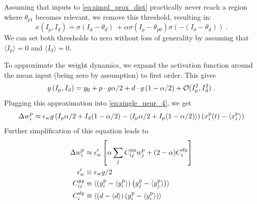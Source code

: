 \documentclass[10pt,a4paper,draft]{article}
\newcommand{\avg}[1]{\langle #1 \rangle}
\begin{document}
Assuming that inputs to \eqref{eq:simpl_prox_dist} practically never reach a region where $\theta_{p1}$ becomes relevant, we remove this threshold, resulting in:
\begin{equation}
x\left(I_p,I_d\right) = \sigma\left(I_d-\theta_d\right)\ + \alpha\sigma\left(I_p-\theta_{p0}\right)\sigma\left(-\left(I_d-\theta_d\right)\right) \; . \label{eq:simpl_further_prox_dist}
\end{equation}
We can set both thresholds to zero without loss of generality by assuming that $\langle I_p \rangle = 0$ and $\langle I_d \rangle = 0$.

To approximate the weight dynamics, we expand the activation function around the mean input (being zero by assumption) to first order. This gives
\begin{equation}
y\left(I_{\rm p},I_{\rm d}\right) =  y_0 + p \cdot g \alpha/2  + d \cdot g \left(1-\alpha/2\right) + \mathcal{O}(I_{\rm p}^2,I_{\rm d}^2) \; .
\end{equation}
Plugging this approximation into \eqref{eq:single_neur_4}, we get
\begin{equation}
\Delta w^{\rm p}_{i} \approx \epsilon_w g \left( I_{\rm p} \alpha/2  + I_{\rm d}(1-\alpha/2) -\langle  I_{\rm p} \alpha/2  + I_{\rm p}(1-\alpha/2) \rangle\right)\left(x^{\rm p}_{i}(t)-\langle x^{\rm p}_{i} \rangle \right)
\end{equation}
Further simplification of this equation leads to
\begin{align}
\Delta w^{\rm p}_{i} &\approx \epsilon'_w \left[\alpha \sum_j  C^{yy}_{ij} w^{\rm p}_{j} + (2-\alpha) C^{dy}_i \label{eq:approx_delta_w}\right] \\
\epsilon'_w &\equiv \epsilon_w g /2 \\
C^{yy}_{ij} &\equiv \avg{\left(y^{\rm p}_{i} - \avg{y^{\rm p}_{i}} \right)\left( y^{\rm p}_{j} - \avg{y^{\rm p}_{j}} \right)} \\
C^{dy}_i &\equiv \avg{\left(d - \avg{d} \right) \left(y^{\rm p}_{i} - \avg{y^{\rm p}_{i}} \right)}
\end{align}


\end{document}
